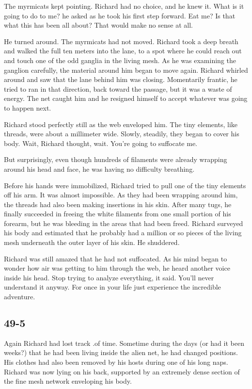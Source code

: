 \documentclass[]{article}
\begin{document}
{{The myrmicats kept pointing. Richard had no choice, and he knew it. What is it going to do to me? he asked as he took his first step forward. Eat me? Is that what this has been all about? That would make no sense at all.

He turned around. The myrmicats had not moved. Richard took a deep breath and walked the full ten meters into the lane, to a spot where he could reach out and touch one of the odd ganglia in the living mesh. As he was examining the ganglion carefully, the material around him began to move again. Richard whirled around and saw that the lane behind him was closing. Momentarily frantic, he tried to ran in that direction, back toward the passage, but it was a waste of energy. The net caught him and he resigned himself to accept whatever was going to happen next.

Richard stood perfectly still as the web enveloped him. The tiny elements, like threads, were about a millimeter wide. Slowly, steadily, they began to cover his body. Wait, Richard thought, wait. You’re going to suffocate me.

But surprisingly, even though hundreds of filaments were already wrapping around his head and face, he was having no difficulty breathing.

Before his hands were immobilized, Richard tried to pull one of the tiny elements off his arm. It was almost impossible. As they had been wrapping around him, the threads had also been making insertions in his skin. After many tugs, he finally succeeded in freeing the white filaments from one small portion of his forearm, but he was bleeding in the areas that had been freed. Richard surveyed his body and estimated that he probably had a million or so pieces of the living mesh underneath the outer layer of his skin. He shuddered.

Richard was still amazed that he had not suffocated. As his mind began to wonder how air was getting to him through the web, he heard another voice inside his head. Stop trying to analyze everything, it said. You’ll never understand it anyway. For once in your life just experience the incredible adventure.

	
\subsection{49-5}

Again Richard had lost track .of time. Sometime during the days (or had it been weeks?) that he had been living inside the alien net, he had changed positions. His clothes had also been removed by his hosts during one of his long naps. Richard was now lying on his back, supported by an extremely dense section of the fine mesh network enveloping his body.

}}
\end{document}
